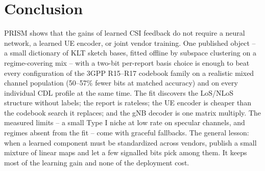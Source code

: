 \documentclass[conference]{IEEEtran}
\begin{document}
\section{Conclusion}
PRISM shows that the gains of learned CSI feedback do not require a neural network, a learned UE encoder, or joint vendor training. One published object -- a small dictionary of KLT sketch bases, fitted offline by subspace clustering on a regime-covering mix -- with a two-bit per-report basis choice is enough to beat every configuration of the 3GPP R15--R17 codebook family on a realistic mixed channel population (50--57\% fewer bits at matched accuracy) and on every individual CDL profile at the same time. The fit discovers the LoS/NLoS structure without labels; the report is rateless; the UE encoder is cheaper than the codebook search it replaces; and the gNB decoder is one matrix multiply. The measured limits -- a small Type I niche at low rate on specular channels, and regimes absent from the fit -- come with graceful fallbacks. The general lesson: when a learned component must be standardized across vendors, publish a small mixture of linear maps and let a few signalled bits pick among them. It keeps most of the learning gain and none of the deployment cost.
\end{document}
